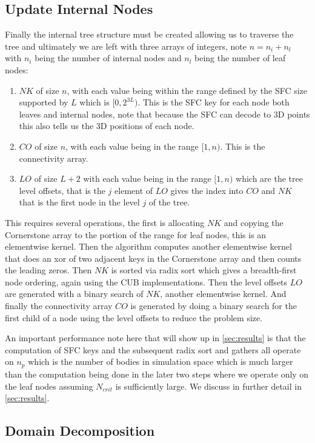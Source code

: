\subsection{Update Internal Nodes}
Finally the internal tree structure must be created allowing us to traverse the tree and ultimately we are left with three arrays of integers, note $n = n_i + n_l$ with $n_i$ being the number of internal nodes and $n_l$ being the number of leaf nodes:
\begin{enumerate}
    \item $NK$ of size $n$, with each value being within the range defined by the SFC size supported by $L$ which is $[0,2^{3L})$. This is the SFC key for each node both leaves and internal nodes, note that because the SFC can decode to 3D points this also tells us the 3D positions of each node.
    \item $CO$ of size $n$, with each value being in the range $[1,n)$. This is the connectivity array.
    \item $LO$ of size $L + 2$ with each value being in the range $[1,n)$ which are the tree level offsets, that is the $j$ element of $LO$ gives the index into $CO$ and $NK$ that is the first node in the level $j$ of the tree.
\end{enumerate}

This requires several operations, the first is allocating $NK$ and copying the Cornerstone array to the portion of the range for leaf nodes, this is an elementwise kernel. Then the algorithm computes another elementwise kernel that does an xor of two adjacent keys in the Cornerstone array and then counts the leading zeros. Then $NK$ is sorted via radix sort which gives a breadth-first node ordering, again using the CUB implementations. Then the level offsets $LO$ are generated with a binary search of $NK$, another elementwise kernel. And finally the connectivity array $CO$ is generated by doing a binary search for the first child of a node using the level offsets to reduce the problem size.

An important performance note here that will show up in \ref{sec:results} is that the computation of SFC keys and the subsequent radix sort and gathers all operate on $n_p$ which is the number of bodies in simulation space which is much larger than the computation being done in the later two steps where we operate only on the leaf nodes assuming $N_{crit}$ is sufficiently large. We discuss in further detail in \ref{sec:results}.

\subsection{Domain Decomposition}


